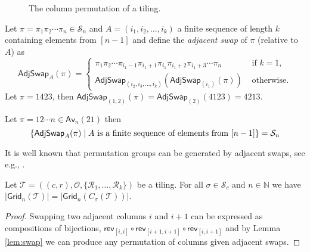 \begin{figure}[!htbp]
    \centering
    
    \caption{The column permutation of a tiling.}
    \label{fig:t_col_perm}
\end{figure}

Let $\pi=\pi_1\pi_2 \dotsm \pi_n \in\mathcal{S}_n$ and $A = (i_1, i_2,\dotsc,i_k)$ a finite sequence of length $k$ containing elements from $[n-1]$ and define the \emph{adjacent swap} of $\pi$ (relative to $A$) as
\[
\textsf{AdjSwap}_{A}(\pi) = \begin{cases}
\pi_1\pi_2 \dotsm \pi_{i_1-1}\pi_{i_1+1}\pi_{i_1}\pi_{i_1+2}\pi_{i_1+3} \dotsm \pi_n & \mbox{ if } k = 1,\\
\textsf{AdjSwap}_{(i_2,i_3,\dotsc,i_k)}\left(\textsf{AdjSwap}_{(i_1)}(\pi)\right) & \mbox{ otherwise.}
\end{cases}
\]
Let $\pi = 1423$, then $\textsf{AdjSwap}_{(1,2)}(\pi) = \textsf{AdjSwap}_{(2)}(4123) = 4213$.

\begin{lemma}\label{lem:swap}
Let $\pi = 12\dotsm n \in \textsf{Av}_n(21)$ then
\[
    \left\{\textsf{AdjSwap}_A(\pi) \mid A \text{ is a finite sequence of elements from } [n-1]\right\} = \mathcal{S}_n
\]
\end{lemma}
It is well known that permutation groups can be generated by adjacent swaps, see e.g., \cite{adjacentperm}.

\begin{comment}\begin{proof}
Suppose we can generate $\mathcal{S}_{n-1}$ this way from the permutation in $\textsf{Av}_{n-1}(21)$ and let $\pi = \pi_1 \pi_2 \dotsm \pi_n \in \mathcal{S}_n$ with $\pi_j = n$. Let $A = (i_1,i_2,\dotsc,i_k)$ be the sequence of swaps that turns $12\dotsm (n-1)$ into $\pi_1 \pi_2 \dotsm \pi_{j-1}\pi_{j+1}\dotsm \pi_n \in \mathcal{S}_{n-1}$, then
\begin{align*}
    \textsf{AdjSwap}_{(i_1,i_2,\dotsc,i_k, n-1, n-2,\dotsc,j)}(12\dotsm n) = \pi
\end{align*}
and since this holds for a base case, it holds for all lengths $n\in\N$.
\end{proof}\end{comment}

\begin{proposition}
Let $\mathcal{T} = ((c,r),\mathcal{O},\{\mathcal{R}_1,\dotsc,\mathcal{R}_k\})$ be a tiling. For all $\sigma\in\mathcal{S}_c$ and $n\in\mathbb{N}$ we have $|\textsf{Grid}_n(\mathcal{T})| = |\textsf{Grid}_n\left(C_\sigma(\mathcal{T})\right)|$.
\end{proposition}
\begin{proof}
Swapping two adjacent columns $i$ and $i+1$ can be expressed as compositions of bijections, $\textsf{rev}_{[i,i]} \circ \textsf{rev}_{[i+1,i+1]} \circ \textsf{rev}_{[i,i+1]}$ and by Lemma \ref{lem:swap} we can produce any permutation of columns given adjacent swaps.
\end{proof}